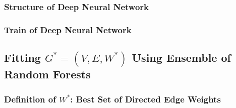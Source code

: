 \documentclass[12pt,letterpaper]{article}
\begin{document}








\subsubsection{Structure of Deep Neural Network} 
\subsubsection{Train of Deep Neural Network} 









\subsection{Fitting $G^* = (V, E, W^*)$ Using Ensemble of Random Forests}
\subsubsection{Definition of $W^*$: Best Set of Directed Edge Weights} %

\end{document}
